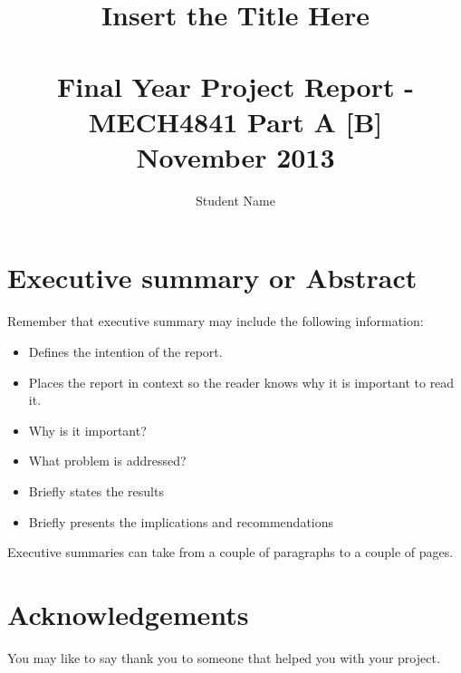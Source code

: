 \documentclass{UoNMCHA}
\numberwithin{equation}{section}
\begin{document}
\title{Insert the Title Here \\ \ \\
{\small Final Year Project Report - MECH4841 Part A [B]  \\November 2013}}
\author[UoNMCHA]{Student Name}
\address[UoNMCHA]{
Student of Mechatronics Engineering,\\
The University of Newcastle, Callaghan, NSW 2308, AUSTRALIA \\
Student Number: 3...... \\
E-mail: \href{mailto:First.Last@uon.edu.au}{\textsf{First.Last@uon.edu.au}}}
\maketitle
\onecolumn

\vspace{-5mm}
\section*{Executive summary or Abstract}
\vspace{-3mm}
Remember that executive summary may include the following information:
\begin{itemize}
    \item Defines the intention of the report.
    \item Places the report in context so the reader knows why it is important to read it.
    \item Why is it important?
    \item What problem is addressed?
    \item Briefly states the results
    \item Briefly presents the implications and recommendations
\end{itemize}
Executive summaries can take from a couple of paragraphs to a couple of pages.
\vspace{-2mm}
\section*{Acknowledgements}
\vspace{-3mm}
You may like to say thank you to someone that helped you with your project.
\newpage
\tableofcontents
\newpage
\end{document}
